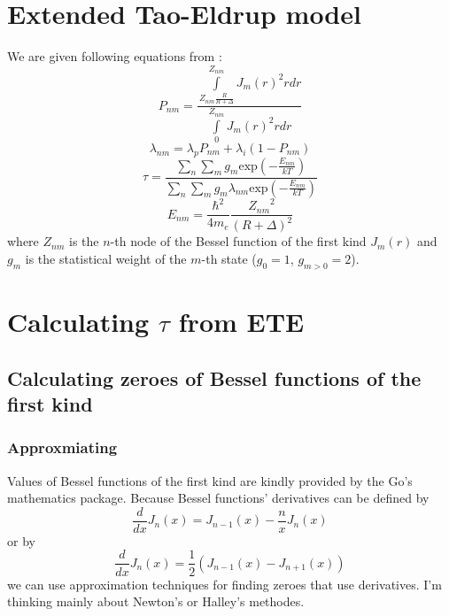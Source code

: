 \documentclass[a4paper]{article}
\begin{document}
	\section{Extended Tao-Eldrup model}
	We are given following equations from \cite{Zaleski2015}:
	\begin{equation}
		\label{eq1}
		P_{nm} = 
			\frac
				{\int\limits_{Z_{nm}\frac{R}{R+\Delta}}^{Z_{nm}}J_m(r)^2rdr}
				{\int\limits_0^{Z_{nm}}J_m(r)^2rdr}
	\end{equation}
	\begin{equation}
		\lambda_{nm} = \lambda_pP_{nm} + \lambda_i(1-P_{nm})
	\end{equation}
	\begin{equation}
		\tau =
			\frac
				{\sum\limits_n\sum\limits_mg_m\mathrm{exp}\left(-\frac{E_{nm}}{kT}\right)}
				{\sum\limits_n\sum\limits_mg_m\lambda_{nm}\mathrm{exp}\left(-\frac{E_{nm}}{kT}\right)}
	\end{equation}
	\begin{equation*}
		E_{nm} = \frac{\hbar^2}{4m_e}\frac{{Z_{nm}}^2}{(R+\Delta)^2}
	\end{equation*}
	where $Z_{nm}$ is the $n$-th node of the Bessel function of the
	first kind $J_m(r)$ and $g_m$ is the statistical weight of the $m$-th state
	($g_0 = 1$, $g_{m>0}=2$).
	\section{Calculating $\tau$ from ETE}
	\subsection{Calculating zeroes of Bessel functions of the first kind}
	\subsubsection{Approxmiating}
	Values of Bessel functions of the first kind are
	kindly provided by the Go's mathematics package.
	Because Bessel functions' derivatives can be defined by 
	\begin{equation*}
		\frac{d}{dx}J_n(x) = J_{n-1}(x) - \frac{n}{x}J_n(x)
	\end{equation*}
	or by
	\begin{equation*}
		\frac{d}{dx}J_n(x) = \frac{1}{2}(J_{n-1}(x) - J_{n+1}(x))
	\end{equation*}
	we can use approximation techniques for finding zeroes that use derivatives.
	I'm thinking mainly about Newton's or Halley's methodes.
\end{document}
